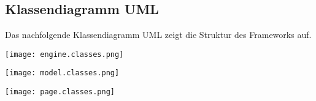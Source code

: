 \subsection{Klassendiagramm UML}
Das nachfolgende Klassendiagramm UML zeigt die Struktur des Frameworks auf.

\vspace{2mm}
\mbox{}
\begin{center}
    \texttt{[image: engine.classes.png]}
\end{center}

\mbox{}
\begin{center}
    \texttt{[image: model.classes.png]}
\end{center}

\mbox{}
\begin{center}
    \texttt{[image: page.classes.png]}
\end{center}
\vspace{2mm}
